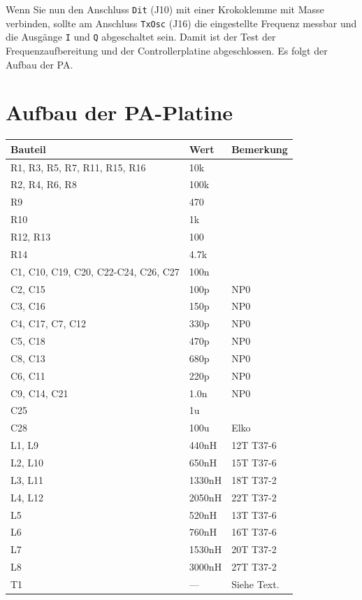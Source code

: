 \documentclass[10pt, a4paper]{paper}
\newcommand{\con}[1]{\texttt{#1}}
\begin{document}
Wenn Sie nun den Anschluss \con{Dit} (J10) mit einer Krokoklemme mit Masse verbinden, sollte am Anschluss \con{TxOsc} (J16) die eingestellte Frequenz messbar und die Ausgänge \con{I} und \con{Q} abgeschaltet sein. Damit ist der Test der Frequenzaufbereitung und der Controllerplatine abgeschlossen. Es folgt der Aufbau der PA.


\clearpage
\section{Aufbau der PA-Platine} \label{sec:pa}
\begin{table}
 \begin{tabular}{|p{3cm}|p{2cm}|p{2cm}|} \hline 
 Bauteil & Wert & Bemerkung \\ \hline
 R1, R3, R5, R7, R11, R15, R16 & 10k & \\
 R2, R4, R6, R8 & 100k & \\
 R9 & 470 & \\
 R10 & 1k & \\
 R12, R13 & 100 & \\
 R14 & 4.7k & \\
 
 C1, C10, C19, C20, C22-C24, C26, C27 & 100n & \\
 C2, C15 & 100p & NP0 \\
 C3, C16 & 150p & NP0 \\
 C4, C17, C7, C12 & 330p & NP0 \\
 C5, C18 & 470p & NP0 \\
 C8, C13 & 680p & NP0 \\
 C6, C11 & 220p & NP0 \\
 C9, C14, C21 & 1.0n & NP0 \\
 C25 & 1u & \\
 C28 & 100u & Elko \\
 
 L1, L9 & 440nH & 12T T37-6\\
 L2, L10 & 650nH & 15T T37-6\\
 L3, L11 & 1330nH & 18T T37-2\\
 L4, L12 & 2050nH & 22T T37-2\\
 L5 & 520nH & 13T T37-6\\
 L6 & 760nH & 16T T37-6\\
 L7 & 1530nH & 20T T37-2\\
 L8 & 3000nH & 27T T37-2\\

 T1 & --- & Siehe Text.\\ 
 

\end{tabular}
\end{table}
\end{document}

